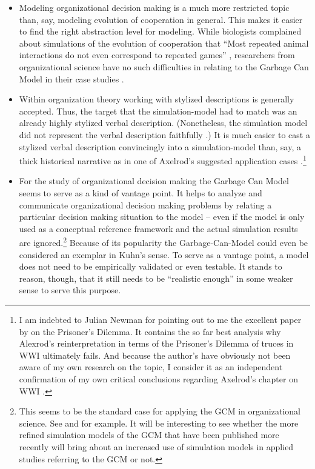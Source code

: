 \documentclass[12pt, a4paper]{article}
\begin{document}
\begin{itemize}

  \item Modeling organizational decision making is a much more
  restricted topic than, say, modeling evolution of cooperation in
  general. This makes it easier to find the right abstraction level
  for modeling. While biologists complained about simulations of the
  evolution of cooperation that ``Most repeated animal interactions do
  not even correspond to repeated games'' \citep[p.\
  83]{hammerstein:2003}, researchers from organizational science have
  no such difficulties in relating to the Garbage Can Model in their
  case studies \citep{fardal-sornes:2008, delgoshaei:2013}.

  \item Within organization theory working with stylized descriptions is
  generally accepted. Thus, the target that the simulation-model had to match
  was an already highly stylized verbal description. (Nonetheless, the
  simulation model did not represent the verbal description faithfully
  \citep[1.4]{fioretti:2008}.) It is much easier to cast a stylized verbal
  description convincingly into a simulation-model than, say, a thick
  historical narrative as in one of Axelrod's suggested application cases
  \citep{northcott-alexandrova:2015, arnold:2008}.\footnote{I am indebted to
  Julian Newman for pointing out to me the excellent paper by
  \citet{northcott-alexandrova:2015} on the Prisoner's Dilemma. It contains the
  so far best analysis why Alexrod's reinterpretation in terms of the
  Prisoner's Dilemma of truces in WWI ultimately fails. And because the
  author's have obviously not been aware of my own research on the topic, I
  consider it as an independent confirmation of my own critical conclusions
  regarding Axelrod's chapter on WWI \citep[ch. 5.2.2]{arnold:2008}.}

  \item For the study of organizational decision making the Garbage
  Can Model seems to serve as a kind of vantage point. It helps to
  analyze and communicate organizational decision making problems by
  relating a particular decision making situation to the model -- even
  if the model is only used as a conceptual reference framework and
  the actual simulation results are ignored.\footnote{This seems to be
  the standard case for applying the GCM in organizational science.
  See \citet{fardal-sornes:2008} and \citet{delgoshaei:2013} for
  example. It will be interesting to see whether the more refined
  simulation models of the GCM that have been published more recently
  \citep{fioretti:2008} will bring about an increased use of
  simulation models in applied studies referring to the GCM or not.}
  Because of its popularity the Garbage-Can-Model could even be
  considered an exemplar in Kuhn's sense. To serve as a vantage point,
  a model does not need to be empirically validated or even testable.
  It stands to reason, though, that it still needs to be ``realistic
  enough'' in some weaker sense to serve this purpose.


\end{itemize}
\end{document}
